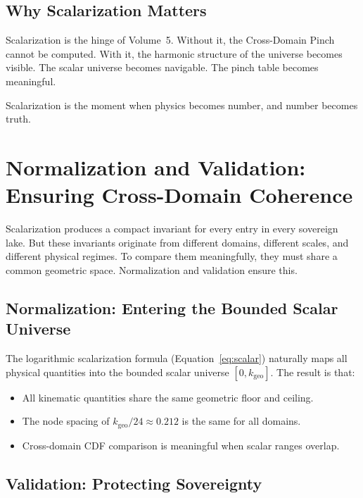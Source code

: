 \documentclass[11pt, letterpaper, openany]{book}
\begin{document}
\section*{Why Scalarization Matters}

Scalarization is the hinge of Volume~5. Without it, the Cross-Domain Pinch cannot be computed.
With it, the harmonic structure of the universe becomes visible. The scalar universe becomes
navigable. The pinch table becomes meaningful.

Scalarization is the moment when physics becomes number,
and number becomes truth.

\chapter{Normalization and Validation: Ensuring Cross-Domain Coherence}

Scalarization produces a compact invariant for every entry in every sovereign lake. But these
invariants originate from different domains, different scales, and different physical regimes.
To compare them meaningfully, they must share a common geometric space. Normalization and
validation ensure this.

\section*{Normalization: Entering the Bounded Scalar Universe}

The logarithmic scalarization formula (Equation~\ref{eq:scalar}) naturally maps all physical
quantities into the bounded scalar universe $[0, k_\text{geo}]$. The result is that:

\begin{itemize}
    \item All kinematic quantities share the same geometric floor and ceiling.
    \item The node spacing of $k_\text{geo}/24 \approx 0.212$ is the same for all domains.
    \item Cross-domain CDF comparison is meaningful when scalar ranges overlap.
\end{itemize}

\section*{Validation: Protecting Sovereignty}
\end{document}
